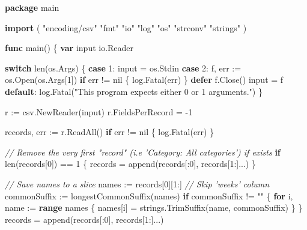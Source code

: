\documentclass[]{book}
\newenvironment{Shaded}{\begin{snugshade}}{\end{snugshade}}
\newcommand{\BuiltInTok}[1]{#1}
\newcommand{\CommentTok}[1]{\textcolor[rgb]{0.56,0.35,0.01}{\textit{#1}}}
\newcommand{\DecValTok}[1]{\textcolor[rgb]{0.00,0.00,0.81}{#1}}
\newcommand{\KeywordTok}[1]{\textcolor[rgb]{0.13,0.29,0.53}{\textbf{#1}}}
\newcommand{\NormalTok}[1]{#1}
\newcommand{\OtherTok}[1]{\textcolor[rgb]{0.56,0.35,0.01}{#1}}
\newcommand{\StringTok}[1]{\textcolor[rgb]{0.31,0.60,0.02}{#1}}
\begin{document}
\begin{Shaded}
\begin{Highlighting}[]
\KeywordTok{package}\NormalTok{ main}

\KeywordTok{import}\NormalTok{ (}
    \StringTok{"encoding/csv"}
    \StringTok{"fmt"}
    \StringTok{"io"}
    \StringTok{"log"}
    \StringTok{"os"}
    \StringTok{"strconv"}
    \StringTok{"strings"}
\NormalTok{)}

\KeywordTok{func}\NormalTok{ main() \{}
    \KeywordTok{var}\NormalTok{ input io.Reader}

    \KeywordTok{switch} \BuiltInTok{len}\NormalTok{(os.Args) \{}
    \KeywordTok{case} \DecValTok{1}\NormalTok{:}
\NormalTok{        input = os.Stdin}
    \KeywordTok{case} \DecValTok{2}\NormalTok{:}
\NormalTok{        f, err := os.Open(os.Args[}\DecValTok{1}\NormalTok{])}
        \KeywordTok{if}\NormalTok{ err != }\OtherTok{nil}\NormalTok{ \{}
\NormalTok{            log.Fatal(err)}
\NormalTok{        \}}
        \KeywordTok{defer}\NormalTok{ f.Close()}
\NormalTok{        input = f}
    \KeywordTok{default}\NormalTok{:}
\NormalTok{        log.Fatal(}\StringTok{"This program expects either 0 or 1 arguments."}\NormalTok{)}
\NormalTok{    \}}

\NormalTok{    r := csv.NewReader(input)}
\NormalTok{    r.FieldsPerRecord = }\DecValTok{-1}

\NormalTok{    records, err := r.ReadAll()}
    \KeywordTok{if}\NormalTok{ err != }\OtherTok{nil}\NormalTok{ \{}
\NormalTok{        log.Fatal(err)}
\NormalTok{    \}}

    \CommentTok{// Remove the very first "record" (i.e 'Category: All categories') if exists}
    \KeywordTok{if} \BuiltInTok{len}\NormalTok{(records[}\DecValTok{0}\NormalTok{]) == }\DecValTok{1}\NormalTok{ \{}
\NormalTok{        records = }\BuiltInTok{append}\NormalTok{(records[:}\DecValTok{0}\NormalTok{], records[}\DecValTok{1}\NormalTok{:]...)}
\NormalTok{    \}}

    \CommentTok{// Save names to a slice}
\NormalTok{    names := records[}\DecValTok{0}\NormalTok{][}\DecValTok{1}\NormalTok{:] }\CommentTok{// Skip 'weeks' column}
\NormalTok{    commonSuffix := longestCommonSuffix(names)}
    \KeywordTok{if}\NormalTok{ commonSuffix != }\StringTok{""}\NormalTok{ \{}
        \KeywordTok{for}\NormalTok{ i, name := }\KeywordTok{range}\NormalTok{ names \{}
\NormalTok{            names[i] = strings.TrimSuffix(name, commonSuffix)}
\NormalTok{        \}}
\NormalTok{    \}}
\NormalTok{    records = }\BuiltInTok{append}\NormalTok{(records[:}\DecValTok{0}\NormalTok{], records[}\DecValTok{1}\NormalTok{:]...)}


\end{Highlighting}
\end{Shaded}
\end{document}
